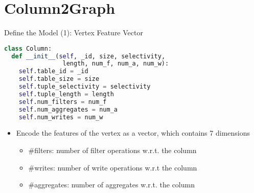 \documentclass{beamer}
\begin{document}
\section{Column2Graph}
\begin{frame}[fragile]{Define the Model (1): Vertex Feature Vector}
    \begin{minipage}{1.0\linewidth}
\begin{lstlisting}[language=Python]
class Column:
  def __init__(self, _id, size, selectivity,
                length, num_f, num_a, num_w):
    self.table_id = _id
    self.table_size = size
    self.tuple_selectivity = selectivity
    self.tuple_length = length
    self.num_filters = num_f
    self.num_aggregates = num_a
    self.num_writes = num_w
\end{lstlisting}
    \end{minipage}\hspace{0cm}
    \begin{minipage}{1.0\linewidth}
        \begin{itemize}
            \item Encode the features of the vertex as a vector, which contains 7 dimensions
            \begin{itemize}
                \item #filters: number of filter operations w.r.t. the column
                \item #writes: number of write operations w.r.t the column
                \item #aggregates: number of aggregates w.r.t. the column
            \end{itemize}
        \end{itemize}
    \end{minipage}
\end{frame}
\end{document}
